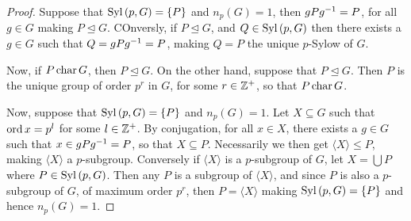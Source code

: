 \begin{proof}
    Suppose that $\operatorname{Syl}{(p,G)}=\{P\}$ and $n_p(G)=1$, then $gPg^{-1}=P$, for
    all $g \in G$ making $P \unlhd G$. COnversly, if $P \unlhd G$, and  $Q \in
    \operatorname{Syl}{(p,G)}$ then there exists a $g \in G$ such that  $Q=gPg^{-1}=P$, making
    $Q=P$ the unique $p$-Sylow of $G$.

    Now, if  $P \operatorname{char} G$, then  $P \unlhd G$. On the other hand, suppose that
    $P \unlhd G$. Then  $P$ is the unique group of order $p^r$ in $G$, for some
     $r \in \mathbb{Z}^+$, so that  $P \operatorname{char} G$.

     Now, suppose that $\operatorname{Syl}{(p,G)}=\{P\}$ and $n_p(G)=1$. Let $X \subseteq G$
     such that $\operatorname{ord}{x}=p^l$ for some $l \in \mathbb{Z}^+$. By conjugation, for all  $x
     \in X$, there exists a  $g \in G$ such that  $x \in gPg^{-1}=P$, so that
     $X \subseteq P$. Necessarily we then get  $\langle X \rangle \leq P$,
     making $\langle X \rangle$ a $p$-subgroup. Conversely if  $\langle X
     \rangle$ is a $p$-subgroup of $G$, let $X=\bigcup{P}$ where $P \in
     \operatorname{Syl}{(p,G)}$. Then any $P$ is a subgroup of  $\langle X \rangle$, and since
     $P$ is also a $p$-subgroup of  $G$, of maximum order $p^r$, then
     $P=\langle X \rangle$ making $\operatorname{Syl}{(p,G)}=\{P\}$ and hence $n_p(G)=1$.
\end{proof}
